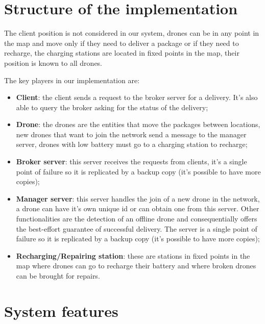 \documentclass[a4paper, oneside]{memoir}
\begin{document}
\section{Structure of the implementation}

The client position is not considered in our system, drones can be in any point in the map and move only if they need to deliver a package or if they need to recharge, the charging stations are located in fixed points in the map, their position is known to all drones.

The key players in our implementation are:
\begin{itemize}
\item \textbf{Client}: the client sends a request to the broker server for a delivery. It's also able to query the broker asking for the status of the delivery;
\item \textbf{Drone}: the drones are the entities that move the packages between locations, new drones that want to join the network send a message to the manager server, drones with low battery must go to a charging station to recharge;
\item \textbf{Broker server}: this server receives the requests from clients, it's a single point of failure so it is replicated by a backup copy (it's possible to have more copies);
\item \textbf{Manager server}: this server handles the join of a new drone in the network, a drone can have it's own unique id or can obtain one from this server. Other functionalities are the detection of an offline drone and consequentially offers the best-effort guarantee of successful delivery. The server is a single point of failure so it is replicated by a backup copy (it's possible to have more copies);
\item \textbf{Recharging/Repairing station}: these are stations in fixed points in the map where drones can go to recharge their battery and where broken drones can be brought for repairs.
\end{itemize}


\section{System features}
\end{document}

